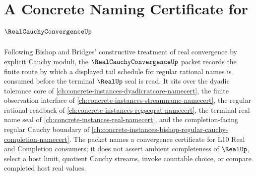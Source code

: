 \chapter{A Concrete Naming Certificate for $\RealCauchyConvergenceUp$}
\label{ch:concrete-instances-real-cauchy-convergence-namecert}

Following Bishop and Bridges' constructive treatment of real convergence by explicit Cauchy moduli, the $\RealCauchyConvergenceUp$ packet records the finite route by which a displayed tail schedule for regular rational names is consumed before the terminal $\RealUp$ seal is read. It sits over the dyadic tolerance core of \autoref{ch:concrete-instances-dyadicratcore-namecert}, the finite observation interface of \autoref{ch:concrete-instances-streamname-namecert}, the regular rational readback of \autoref{ch:concrete-instances-regseqrat-namecert}, the terminal real-name seal of \autoref{ch:concrete-instances-real-namecert}, and the completion-facing regular Cauchy boundary of \autoref{ch:concrete-instances-bishop-regular-cauchy-completion-namecert}. The packet names a convergence certificate for L10 Real and Completion consumers; it does not assert ambient completeness of $\RealUp$, select a host limit, quotient Cauchy streams, invoke countable choice, or compare completed host real values.

